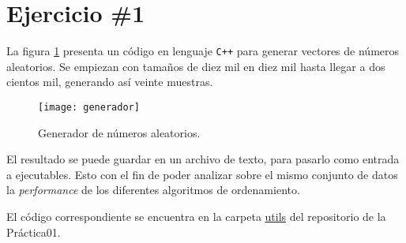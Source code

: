 \section*{Ejercicio \#1}
La figura \ref{fig:generador} presenta un código en lenguaje \verb!C++! para generar vectores de números aleatorios. Se empiezan con tamaños de diez mil en diez mil hasta llegar a dos cientos mil, generando así veinte muestras.
\begin{figure}[H]
  \centering
  \texttt{[image: generador]}
  \caption{Generador de números aleatorios.}
  \label{fig:generador}
\end{figure}

El resultado se puede guardar en un archivo de texto, para pasarlo como entrada a ejecutables. Esto con el fin de poder analizar sobre el mismo conjunto de datos la \textit{performance} de los diferentes algoritmos de ordenamiento.

El código correspondiente se encuentra en la carpeta \href{https://github.com/syordya/CSUNSA-EDA/tree/master/Practica01/utils}{utils} del repositorio de la Práctica01.

\iffalse
Como se muestra en la figuras \ref{fig:act-1_a} y \ref{fig:act-1_b}.
\begin{figure}[H]
\centering
\begin{minipage}{0.45\textwidth}
  \centering
  \texttt{[image: act-1\_a]}
  \caption{Envío de \textit{ICMP ECHO REQUEST} de PC0 a PC1, PC2 y PC3.}
  \label{fig:act-1_a}
\end{minipage}\hfill
\begin{minipage}{0.45\textwidth}
  \centering
  \texttt{[image: act-1\_b]}
  \caption{Respuesta de PC1, PC2 y PC3. Tabla ARP de PC0.}
  \label{fig:act-1_b}
\end{minipage}
\end{figure}
Como se muestra en la figura \ref{fig:act-3}
\begin{figure}[H]
  \centering
  \texttt{[image: act-3]}
  \caption{Tabla de subneteo para la red 192.168.100.0.}
  \label{fig:act-3}
\end{figure}
\fi